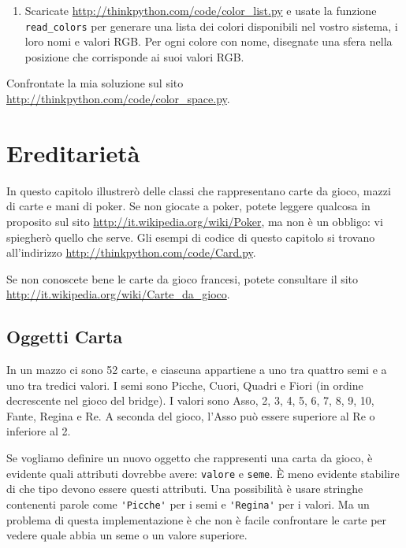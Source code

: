 \documentclass[10pt]{book}
\begin{document}
\begin{exercise}
\begin{enumerate}
\item Scaricate \url{http://thinkpython.com/code/color_list.py}
e usate la funzione \verb"read_colors" per generare una lista dei colori disponibili nel vostro sistema, i loro nomi e valori RGB. Per ogni colore con nome, disegnate una sfera nella posizione che corrisponde ai suoi valori RGB.



\end{enumerate}

Confrontate la mia soluzione sul sito \url{http://thinkpython.com/code/color_space.py}.

\end{exercise}


\chapter{Ereditarietà}

In questo capitolo illustrerò delle classi che rappresentano carte da gioco, mazzi di carte e mani di poker. Se non giocate a poker, potete leggere qualcosa in proposito sul sito \url{http://it.wikipedia.org/wiki/Poker}, ma non è un obbligo: vi spiegherò quello che serve. Gli esempi di codice di questo capitolo si trovano all'indirizzo
\url{http://thinkpython.com/code/Card.py}.

Se non conoscete bene le carte da gioco francesi, potete consultare il sito \url{http://it.wikipedia.org/wiki/Carte_da_gioco}.


\section{Oggetti Carta}

In un mazzo ci sono 52 carte, e ciascuna appartiene a uno tra quattro semi e a uno tra tredici valori. I semi sono Picche, Cuori, Quadri e Fiori (in ordine decrescente nel gioco del bridge). I valori sono Asso, 2, 3, 4, 5, 6, 7, 8, 9, 10, Fante, Regina e Re. A seconda del gioco, l'Asso può essere superiore al Re o inferiore al 2.

Se vogliamo definire un nuovo oggetto che rappresenti una carta da gioco, è evidente quali attributi dovrebbe avere: {\tt valore} e
{\tt seme}.  È meno evidente stabilire di che tipo devono essere questi attributi. Una possibilità è usare stringhe contenenti parole come
\verb"'Picche'" per i semi e \verb"'Regina'" per i valori. Ma un problema di questa implementazione è che non è facile confrontare le carte per vedere quale abbia un seme o un valore superiore.
\end{document}
